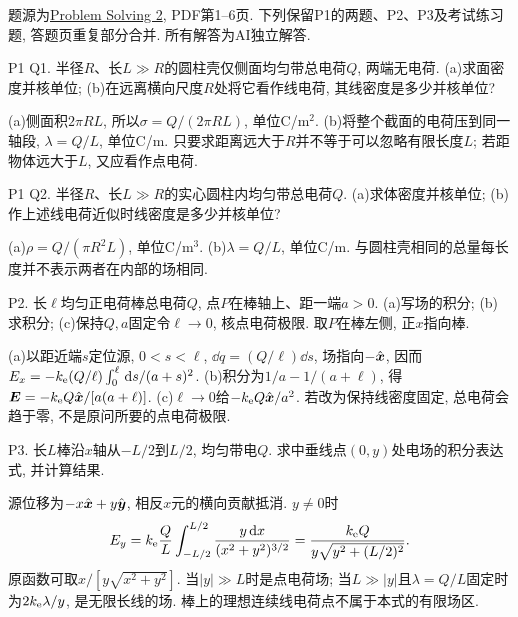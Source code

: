 题源为\href{https://ocw.mit.edu/courses/8-02-physics-ii-electricity-and-magnetism-spring-2007/resources/solving02/}{Problem Solving 2}, PDF第1--6页. 下列保留P1的两题、P2、P3及考试练习题, 答题页重复部分合并. 所有解答为AI独立解答.

\begin{exercise}
P1 Q1. 半径$R$、长$L\gg R$的圆柱壳仅侧面均匀带总电荷$Q$, 两端无电荷. (a)求面密度并核单位; (b)在远离横向尺度$R$处将它看作线电荷, 其线密度是多少并核单位?
\end{exercise}
\begin{solution}
(a)侧面积$2\pi RL$, 所以$\sigma=Q/(2\pi RL)$, 单位C/m$^2$. (b)将整个截面的电荷压到同一轴段, $\lambda=Q/L$, 单位C/m. 只要求距离远大于$R$并不等于可以忽略有限长度$L$; 若距物体远大于$L$, 又应看作点电荷.
\end{solution}

\begin{exercise}
P1 Q2. 半径$R$、长$L\gg R$的实心圆柱内均匀带总电荷$Q$. (a)求体密度并核单位; (b)作上述线电荷近似时线密度是多少并核单位?
\end{exercise}
\begin{solution}
(a)$\rho=Q/(\pi R^2L)$, 单位C/m$^3$. (b)$\lambda=Q/L$, 单位C/m. 与圆柱壳相同的总量每长度并不表示两者在内部的场相同.
\end{solution}

\begin{exercise}
P2. 长$\ell$均匀正电荷棒总电荷$Q$, 点$P$在棒轴上、距一端$a>0$. (a)写场的积分; (b)求积分; (c)保持$Q,a$固定令$\ell\to0$, 核点电荷极限. 取$P$在棒左侧, 正$x$指向棒.
\end{exercise}
\begin{solution}
(a)以距近端$s$定位源, $0<s<\ell$, $\dd q=(Q/\ell)\dd s$, 场指向$-\hat{\boldsymbol{x}}$, 因而$E_x=-k_{\mathrm e}(Q/\ell)\int_0^\ell\,\mathrm d s/(a+s)^2$.
(b)积分为$1/a-1/(a+\ell)$, 得$\boldsymbol{E}=-k_{\mathrm e} Q\hat{\boldsymbol{x}}/[a(a+\ell)]$.
(c)$\ell\to0$给$-k_{\mathrm e} Q\hat{\boldsymbol{x}}/a^2$. 若改为保持线密度固定, 总电荷会趋于零, 不是原问所要的点电荷极限.
\end{solution}

\begin{exercise}
P3. 长$L$棒沿$x$轴从$-L/2$到$L/2$, 均匀带电$Q$. 求中垂线点$(0,y)$处电场的积分表达式, 并计算结果.
\end{exercise}
\begin{solution}
源位移为$-x\hat{\boldsymbol{x}}+y\hat{\boldsymbol{y}}$, 相反$x$元的横向贡献抵消. $y\ne0$时
\[
E_y=k_{\mathrm e}\frac QL\int_{-L/2}^{L/2}\frac{y\,\mathrm d x}{(x^2+y^2)^{3/2}}
=\frac{k_{\mathrm e} Q}{y\sqrt{y^2+(L/2)^2}}.
\]
原函数可取$x/[y\sqrt{x^2+y^2}]$. 当$|y|\gg L$时是点电荷场; 当$L\gg|y|$且$\lambda=Q/L$固定时为$2k_{\mathrm e}\lambda/y$, 是无限长线的场. 棒上的理想连续线电荷点不属于本式的有限场区.
\end{solution}

